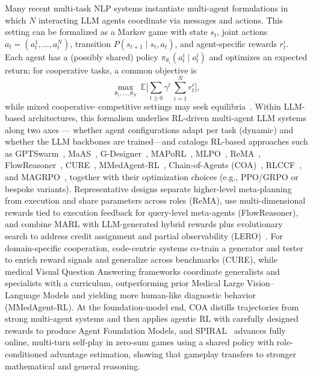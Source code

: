 \documentclass{article}
\numberwithin{equation}{section}
\newcommand{\E}{\mathbb E}
\begin{document}
Many recent multi-task NLP systems instantiate multi-agent formulations in which $N$ interacting LLM agents coordinate via messages and actions. This setting can be formalized as a Markov game with state $s_t$, joint actions $a_t=(a_t^1,\dots,a_t^N)$, transition $P(s_{t+1}\mid s_t,a_t)$, and agent-specific rewards $r_t^i$. Each agent has a (possibly shared) policy $\pi_{\theta_i}(a_t^i\mid o_t^i)$ and optimizes an expected return; for cooperative tasks, a common objective is
\begin{equation}\label{eq:marl_objective}
\max_{\theta_1,\dots,\theta_N}\ \E\Big[\sum_{t\ge 0}\gamma^t\,\sum_{i=1}^N r_t^i\Big],
\end{equation}
while mixed cooperative--competitive settings may seek equilibria~\cite{gronauer2022marl_survey}.
Within LLM-based architectures, this formalism underlies RL-driven multi-agent LLM systems along two axes --- whether agent configurations adapt per task (dynamic) and whether the LLM backbones are trained---and catalogs RL-based approaches such as GPTSwarm~\cite{zhuge2024gptswarm}, MaAS~\cite{zhang2025multi}, G-Designer~\cite{zhang2024g}, MAPoRL~\cite{park2025maporl}, MLPO~\cite{estornell2025train}, ReMA~\cite{wan2025rema}, FlowReasoner~\cite{gao2025flowreasoner}, CURE~\cite{wang2025co}, MMedAgent-RL~\cite{xia2025mmedagent}, Chain-of-Agents (COA)~\cite{li2025chain}, RLCCF~\cite{yuan2025wisdom}, and MAGRPO~\cite{liu2025llm}, together with their optimization choices (e.g., PPO/GRPO or bespoke variants). Representative designs separate higher-level meta-planning from execution and share parameters across roles (ReMA), use multi-dimensional rewards tied to execution feedback for query-level meta-agents (FlowReasoner), and combine MARL with LLM-generated hybrid rewards plus evolutionary search to address credit assignment and partial observability (LERO)~\cite{wei2025lero}. For domain-specific cooperation, code-centric systems co-train a generator and tester to enrich reward signals and generalize across benchmarks (CURE), while medical Visual Question Answering frameworks coordinate generalists and specialists with a curriculum, outperforming prior Medical Large Vision--Language Models and yielding more human-like diagnostic behavior (MMedAgent-RL). At the foundation-model end, COA distills trajectories from strong multi-agent systems and then applies agentic RL with carefully designed rewards to produce Agent Foundation Models, and SPIRAL~\cite{liu2025spiral} advances fully online, multi-turn self-play in zero-sum games using a shared policy with role-conditioned advantage estimation, showing that gameplay transfers to stronger mathematical and general reasoning.
\end{document}
